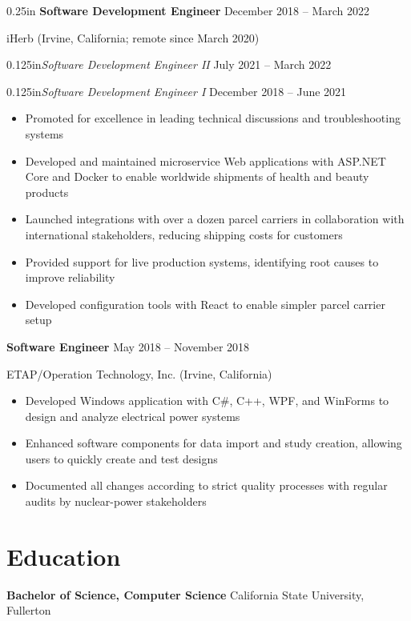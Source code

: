 \documentclass[12pt]{article}
\newcommand{\titleheader}[2]{\textbf{#1} \symbol{"B7} #2}
\newcommand{\secondaryheader}[2]{\begin{adjustwidth}{0.125in}{}\textit{#1} \symbol{"B7} #2\end{adjustwidth}}
\newcommand{\locheader}[2]{#1 (#2)}
\begin{document}
\begin{adjustwidth}{0.25in}{}
	\titleheader{Software Development Engineer}{December 2018 -- March 2022}

	\locheader{iHerb}{Irvine, California; remote since March 2020}

	\secondaryheader{Software Development Engineer II}{July 2021 -- March 2022}

	\secondaryheader{Software Development Engineer I}{December 2018 -- June 2021}

	\begin{itemize}
		\item Promoted for excellence in leading technical discussions and troubleshooting systems
		\item Developed and maintained microservice Web applications with ASP.NET Core and Docker to enable worldwide shipments of health and beauty products
		\item Launched integrations with over a dozen parcel carriers in collaboration with international stakeholders, reducing shipping costs for customers
		\item Provided support for live production systems, identifying root causes to improve reliability
		\item Developed configuration tools with React to enable simpler parcel carrier setup
	\end{itemize}

	\titleheader{Software Engineer}{May 2018 -- November 2018}

	\locheader{ETAP/Operation Technology, Inc.}{Irvine, California}

	\begin{itemize}
		\item Developed Windows application with C\#, C++, WPF, and WinForms to design and analyze electrical power systems
		\item Enhanced software components for data import and study creation, allowing users to quickly create and test designs
		\item Documented all changes according to strict quality processes with regular audits by nuclear-power stakeholders
	\end{itemize}

	\section*{Education}

	\textbf{Bachelor of Science, Computer Science}  California State University, Fullerton

	\end{adjustwidth}
\end{document}
